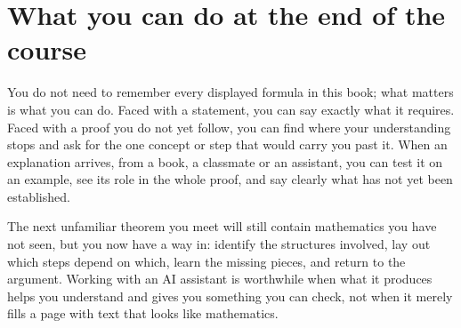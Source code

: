\section{What you can do at the end of the course}\label{appE:sec:finishing}
You do not need to remember every displayed formula in this book; what matters is what you can do. Faced with a statement, you can say exactly what it requires. Faced with a proof you do not yet follow, you can find where your understanding stops and ask for the one concept or step that would carry you past it. When an explanation arrives, from a book, a classmate or an assistant, you can test it on an example, see its role in the whole proof, and say clearly what has not yet been established.

The next unfamiliar theorem you meet will still contain mathematics you have not seen, but you now have a way in: identify the structures involved, lay out which steps depend on which, learn the missing pieces, and return to the argument. Working with an AI assistant is worthwhile when what it produces helps you understand and gives you something you can check, not when it merely fills a page with text that looks like mathematics.

